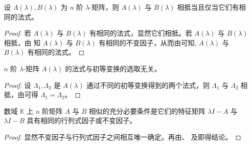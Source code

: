 \documentclass[../../main.tex]{subfiles}
\begin{document}
\begin{corollary}\label{corollary:相抵当且仅当它们有相同的法式}
设 $A(\lambda), B(\lambda)$ 为 $n$ 阶 $\lambda$-矩阵，则 $A(\lambda)$ 与 $B(\lambda)$ 相抵当且仅当它们有相同的法式。
\end{corollary}
\begin{proof}
若 $A(\lambda)$ 与 $B(\lambda)$ 有相同的法式，显然它们相抵。若 $A(\lambda)$ 与 $B(\lambda)$ 相抵，由 知 $A(\lambda)$ 与 $B(\lambda)$ 有相同的不变因子，从而由可知, $A(\lambda)$ 与 $B(\lambda)$ 有相同的法式。
\end{proof}

\begin{corollary}\label{corollary:矩阵法式与初等变换的选取无关}
$n$ 阶 $\lambda$-矩阵 $A(\lambda)$ 的法式与初等变换的选取无关。
\end{corollary}
\begin{proof}
设 $\varLambda_1, \varLambda_2$ 是 $A(\lambda)$ 通过不同的初等变换得到的两个法式，则 $\varLambda_1$ 与 $\varLambda_2$ 相抵，由可得 $\varLambda_1 = \varLambda_2$。
\end{proof}

\begin{theorem}\label{theorem:矩阵相似关于不变因子和行列式因子的充要条件}
数域 $\mathbb{K}$ 上 $n$ 阶矩阵 $A$ 与 $B$ 相似的充分必要条件是它们的特征矩阵 $\lambda I - A$ 与 $\lambda I - B$ 具有相同的行列式因子或不变因子。
\end{theorem}
\begin{proof}
显然不变因子与行列式因子之间相互唯一确定。再由、 及即得结论。
\end{proof}
\end{document}
